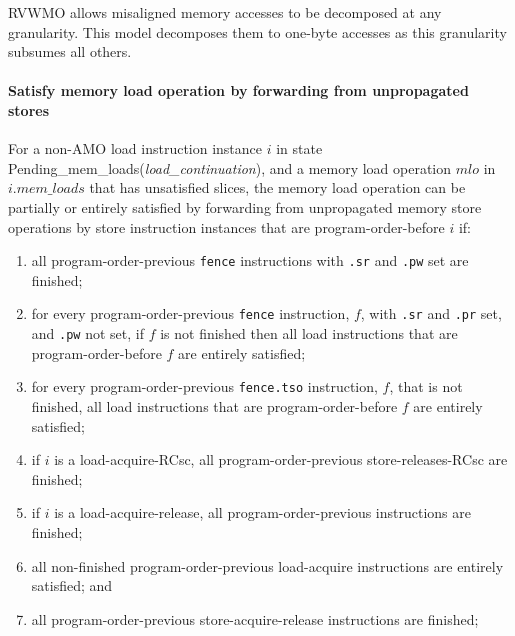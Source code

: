 \begin{commentary}
RVWMO allows misaligned memory accesses to be decomposed at any granularity.
This model decomposes them to one-byte accesses as this granularity subsumes all others.
\end{commentary}

\paragraph{Satisfy memory load operation by forwarding from unpropagated stores}\label{omm:sat_by_forwarding}
For a non-AMO load instruction instance $i$ in state {\sc Pending\_mem\_loads}({\it load\_continuation}), and a memory load operation $mlo$ in $i.\textit{mem\_loads}$ that has unsatisfied slices, the memory load operation can be partially or entirely satisfied by forwarding from unpropagated memory store operations by store instruction instances that are program-order-before $i$ if:
\begin{enumerate}
\item all program-order-previous {\tt fence} instructions with {\tt .sr} and {\tt .pw} set are finished;
\item for every program-order-previous {\tt fence} instruction, $f$, with {\tt .sr} and {\tt .pr} set, and {\tt .pw} not set, if $f$ is not finished then all load instructions that are program-order-before $f$ are entirely satisfied;
\item for every program-order-previous {\tt fence.tso} instruction, $f$, that is not finished, all load instructions that are program-order-before $f$ are entirely satisfied;
\item if $i$ is a load-acquire-RCsc, all program-order-previous store-releases-RCsc are finished;
\item if $i$ is a load-acquire-release, all program-order-previous instructions are finished;
\item all non-finished program-order-previous load-acquire instructions are entirely satisfied; and
\item all program-order-previous store-acquire-release instructions are finished;
\end{enumerate}

